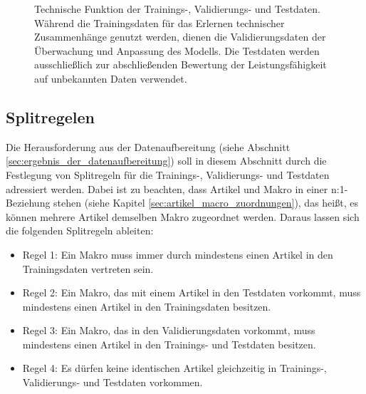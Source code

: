 \begin{figure}[H]
        \caption{Technische Funktion der Trainings-, Validierungs- und Testdaten. Während die Trainingsdaten für das Erlernen technischer Zusammenhänge genutzt werden, dienen die Validierungsdaten der Überwachung und Anpassung des Modells. Die Testdaten werden ausschließlich zur abschließenden Bewertung der Leistungsfähigkeit auf unbekannten Daten verwendet.} 
        \label{fig:datensplit_funktion} 
        \end{figure}


\subsection{Splitregelen}
\label{sec:splitregeln} 

Die Herausforderung aus der Datenaufbereitung (siehe Abschnitt \ref{sec:ergebnis_der_datenaufbereitung}) soll in diesem Abschnitt durch die Festlegung von Splitregeln für die Trainings-, Validierungs- und Testdaten adressiert werden.
Dabei ist zu beachten, dass Artikel und Makro in einer n:1-Beziehung stehen (siehe Kapitel \ref{sec:artikel_macro_zuordnungen}), das heißt, es können mehrere Artikel demselben Makro zugeordnet werden. Daraus lassen sich die folgenden Splitregeln ableiten: 

\begin{itemize} 
    \item Regel 1: Ein Makro muss immer durch mindestens einen Artikel in den Trainingsdaten vertreten sein. 
    \item Regel 2: Ein Makro, das mit einem Artikel in den Testdaten vorkommt, muss mindestens einen Artikel in den Trainingsdaten besitzen. 
    \item Regel 3: Ein Makro, das in den Validierungsdaten vorkommt, muss mindestens einen Artikel in den Trainings- und Testdaten besitzen. 
    \item Regel 4: Es dürfen keine identischen Artikel gleichzeitig in Trainings-, Validierungs- und Testdaten vorkommen. 
\end{itemize} 

